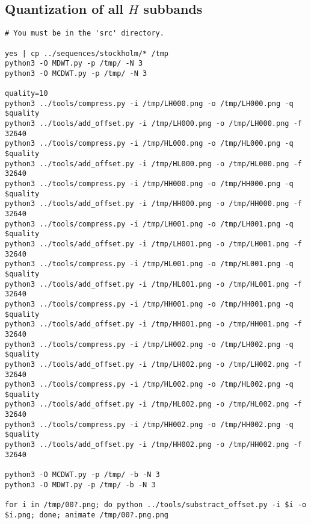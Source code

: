 \subsection{Quantization of all $H$ subbands}
\begin{verbatim}
# You must be in the 'src' directory.

yes | cp ../sequences/stockholm/* /tmp
python3 -O MDWT.py -p /tmp/ -N 3
python3 -O MCDWT.py -p /tmp/ -N 3

quality=10
python3 ../tools/compress.py -i /tmp/LH000.png -o /tmp/LH000.png -q $quality
python3 ../tools/add_offset.py -i /tmp/LH000.png -o /tmp/LH000.png -f 32640
python3 ../tools/compress.py -i /tmp/HL000.png -o /tmp/HL000.png -q $quality
python3 ../tools/add_offset.py -i /tmp/HL000.png -o /tmp/HL000.png -f 32640
python3 ../tools/compress.py -i /tmp/HH000.png -o /tmp/HH000.png -q $quality
python3 ../tools/add_offset.py -i /tmp/HH000.png -o /tmp/HH000.png -f 32640
python3 ../tools/compress.py -i /tmp/LH001.png -o /tmp/LH001.png -q $quality
python3 ../tools/add_offset.py -i /tmp/LH001.png -o /tmp/LH001.png -f 32640
python3 ../tools/compress.py -i /tmp/HL001.png -o /tmp/HL001.png -q $quality
python3 ../tools/add_offset.py -i /tmp/HL001.png -o /tmp/HL001.png -f 32640
python3 ../tools/compress.py -i /tmp/HH001.png -o /tmp/HH001.png -q $quality
python3 ../tools/add_offset.py -i /tmp/HH001.png -o /tmp/HH001.png -f 32640
python3 ../tools/compress.py -i /tmp/LH002.png -o /tmp/LH002.png -q $quality
python3 ../tools/add_offset.py -i /tmp/LH002.png -o /tmp/LH002.png -f 32640
python3 ../tools/compress.py -i /tmp/HL002.png -o /tmp/HL002.png -q $quality
python3 ../tools/add_offset.py -i /tmp/HL002.png -o /tmp/HL002.png -f 32640
python3 ../tools/compress.py -i /tmp/HH002.png -o /tmp/HH002.png -q $quality
python3 ../tools/add_offset.py -i /tmp/HH002.png -o /tmp/HH002.png -f 32640

python3 -O MCDWT.py -p /tmp/ -b -N 3
python3 -O MDWT.py -p /tmp/ -b -N 3

for i in /tmp/00?.png; do python ../tools/substract_offset.py -i $i -o $i.png; done; animate /tmp/00?.png.png
\end{verbatim}

